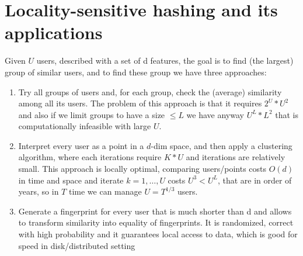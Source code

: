 \section{Locality-sensitive hashing and its applications}
    Given $U$ users, described with a set of d features, the goal is to find (the largest) group of similar users, and to find these group we have three approaches:
    \begin{enumerate}
	\item Try all groups of users and, for each group, check the (average) similarity among all its users.\newline
	      The problem of this approach is that it requires $2^U * U^2$ and also if we limit groups to have a size $\leq L$ we have anyway $U^L * L^2$ 
	      that is computationally infeasible with large $U$.

	\item Interpret every user as a point in a $d$-dim space, and then apply a clustering algorithm, where each iterations require $K * U$ and iterations are relatively small.\newline
	      This approach is locally optimal, comparing users/points costs $O(d)$ in time and space and iterate $k = 1, \dots, U$ costs $U^3 < U^L$, that are in order of years, so 
	      in $T$ time we can manage $U = T^{1/3}$ users.
	
	\item Generate a fingerprint for every user that is much shorter than d and allows to transform similarity into equality of fingerprints.\newline
	      It is randomized, correct with high probability and it guarantees local access to data, which is good for speed in disk/distributed setting
    \end{enumerate}

